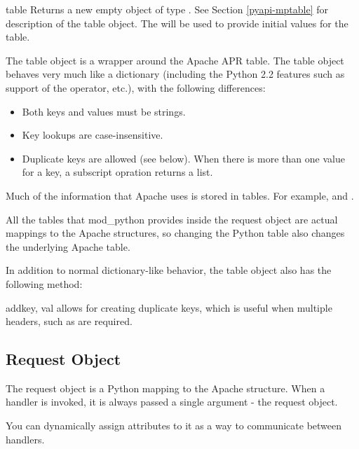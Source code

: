\begin{classdesc}{table}{}
Returns a new empty object of type . See Section
\ref{pyapi-mptable} for description of the table object. The
 will be used to provide initial values for
the table.  

The table object is a wrapper around the Apache APR table. The table
object behaves very much like a dictionary (including the Python 2.2
features such as support of the  operator, etc.), with the 
following differences:

\begin{itemize}
\item
Both keys and values must be strings.
\item
Key lookups are case-insensitive.
\item
Duplicate keys are allowed (see  below). When there is
more than one value for a key, a subscript opration returns a list.
\end{itemize}

Much of the information that Apache uses is stored in tables. For
example,  and .

All the tables that mod_python provides inside the request
object are actual mappings to the Apache structures, so changing the
Python table also changes the underlying Apache table.

In addition to normal dictionary-like behavior, the table object also
has the following method:

\begin{methoddesc}[table]{add}{key, val}
 allows for creating duplicate keys, which is useful 
when multiple headers, such as  are required.
\end{methoddesc}

\end{classdesc}

\subsection{Request Object\label{pyapi-mprequest}}

The request object is a Python mapping to the Apache
 structure. When a handler is invoked, it is always
passed a single argument - the request object. 

You can dynamically assign attributes to it as a way to communicate
between handlers.


